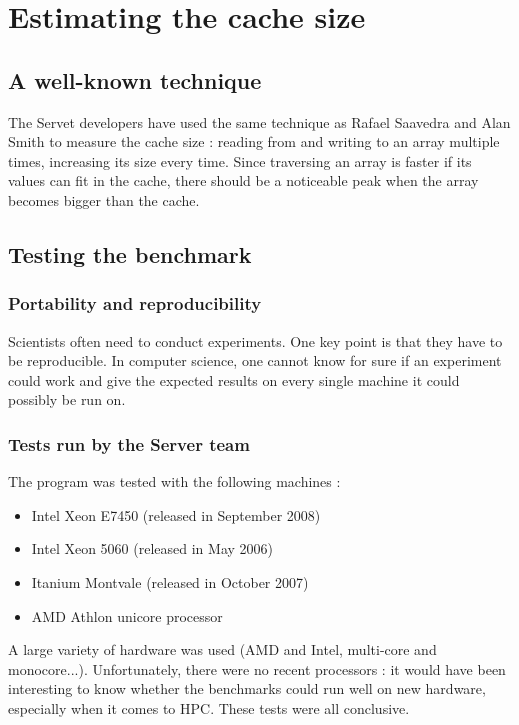 \section{Estimating the cache size}

\subsection{A well-known technique}
The Servet developers have used the same technique as Rafael Saavedra and Alan
Smith\cite{Cache_TLB} to measure the cache size : reading from and writing to an
array multiple times, increasing its size every time. Since traversing an array
is faster if its values can fit in the cache, there should be a noticeable peak
when the array becomes bigger than the cache.

\subsection{Testing the benchmark}
\subsubsection{Portability and reproducibility}
Scientists often need to conduct experiments. One key point is that they have to
be reproducible. In computer science, one cannot know for sure if an experiment
could work and give the expected results on every single machine it could
possibly be run on. 

\subsubsection{Tests run by the Server team}
The program was tested with the following machines :
    \begin{itemize}
        \item Intel Xeon E7450 (released in September 2008)
        \item Intel Xeon 5060 (released in May 2006)
        \item Itanium Montvale (released in October 2007)
        \item AMD Athlon unicore processor
    \end{itemize}

A large variety of hardware was used (AMD and Intel, multi-core and
monocore...). Unfortunately, there were no recent processors : it would have
been interesting to know whether the benchmarks could run well on new hardware,
especially when it comes to HPC. These tests  were all conclusive.

